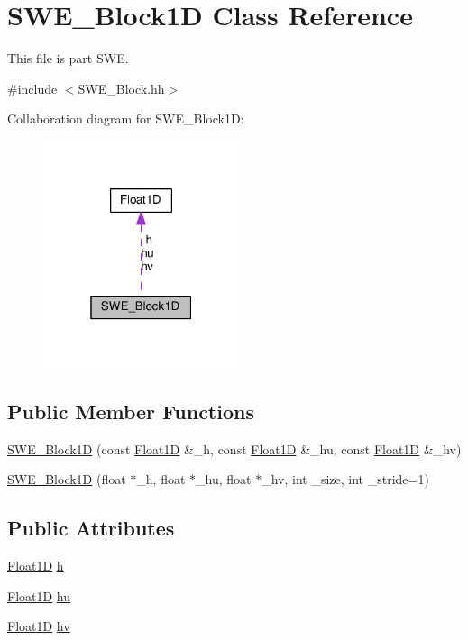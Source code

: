 \hypertarget{structSWE__Block1D}{}\section{S\+W\+E\+\_\+\+Block1D Class Reference}
\label{structSWE__Block1D}


This file is part S\+WE.  




{\ttfamily \#include $<$S\+W\+E\+\_\+\+Block.\+hh$>$}



Collaboration diagram for S\+W\+E\+\_\+\+Block1D\+:\nopagebreak
\begin{figure}[H]
\begin{center}
\leavevmode
\includegraphics[width=163pt]{structSWE__Block1D__coll__graph}
\end{center}
\end{figure}
\subsection*{Public Member Functions}
\begin{DoxyCompactItemize}
\item 
\hyperlink{structSWE__Block1D_a29516674bf63c42f9fd99995c09f4d55}{S\+W\+E\+\_\+\+Block1D} (const \hyperlink{classFloat1D}{Float1D} \&\+\_\+h, const \hyperlink{classFloat1D}{Float1D} \&\+\_\+hu, const \hyperlink{classFloat1D}{Float1D} \&\+\_\+hv)
\item 
\hyperlink{structSWE__Block1D_a9b23e09458246ba4212a1fbfc52206cc}{S\+W\+E\+\_\+\+Block1D} (float $\ast$\+\_\+h, float $\ast$\+\_\+hu, float $\ast$\+\_\+hv, int \+\_\+size, int \+\_\+stride=1)
\end{DoxyCompactItemize}
\subsection*{Public Attributes}
\begin{DoxyCompactItemize}
\item 
\hyperlink{classFloat1D}{Float1D} \hyperlink{structSWE__Block1D_a7bea1da024ec63e77753fe32880fc5d2}{h}
\item 
\hyperlink{classFloat1D}{Float1D} \hyperlink{structSWE__Block1D_a8662233fe9b86ead9ef2a419103271e5}{hu}
\item 
\hyperlink{classFloat1D}{Float1D} \hyperlink{structSWE__Block1D_aa261d9fcdb400d7da349f41dfa6d5b4f}{hv}
\end{DoxyCompactItemize}


